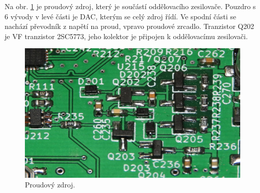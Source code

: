 Na obr. \ref{pcb_current_source} je proudový zdroj, který je součástí oddělovacího zesilovače. Pouzdro s 6 vývody v levé části je DAC, kterým se celý zdroj řídí. Ve spodní části se nachází převodník z napětí na proud, vpravo proudové zrcadlo. Tranzistor Q202 je VF tranzistor 2SC5773, jeho kolektor je připojen k oddělovacímu zesilovači.
\begin{figure}[htbp]
\includegraphics[width=\textwidth,keepaspectratio]{images/pcb/pcb_current_source.jpg}\caption{Proudový zdroj.}\label{pcb_current_source}
\end{figure}

